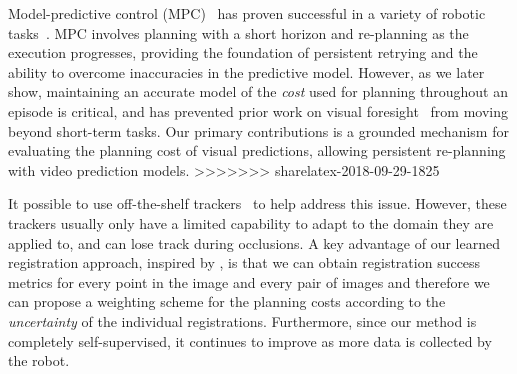 
Model-predictive control (MPC)~\cite{camacho2013model} has proven successful in a variety of robotic tasks~\cite{shim2003decentralized,allibert2010predictive,howard2010receding,williams2017information,deep_mpc}.
MPC involves planning with a short horizon and re-planning as the execution progresses, providing the foundation of persistent retrying and the ability to overcome inaccuracies in the predictive model. However, as we later show, maintaining an accurate model of the \emph{cost} used for planning throughout an episode is critical, and has prevented prior work on visual foresight~\cite{foresight,sna} from moving beyond short-term tasks.
Our primary contributions is a grounded mechanism for evaluating the planning cost of visual predictions, allowing persistent re-planning with video prediction models.
>>>>>>> sharelatex-2018-09-29-1825

%



It possible to use off-the-shelf trackers~\cite{lucas1981iterative,brox2004high,babenko2009visual,mei2009robust} to help address this issue. However, these trackers usually only have a limited capability to adapt to the domain they are applied to, and can lose track during occlusions. A key advantage of our learned registration approach, inspired by \cite{meister2017unflow}, is that we can obtain registration success metrics for every point in the image and every pair of images and therefore we can propose a weighting scheme for the planning costs according to the \emph{uncertainty} of the individual registrations. Furthermore, since our method is completely self-supervised, it continues to improve as more data is collected by the robot.


